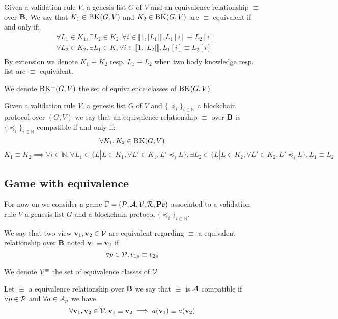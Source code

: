 \begin{mydef}
	Given a validation rule $V$, a genesis list $G$ of $V$ and an equivalence relationship $\equiv$ over $\text{\bf B}$. We say that $K_1 \in \text{\sc BK}(G,V)$ and $K_2 \in \text{\sc BK}(G,V)$ are $\equiv$ equivalent if and only if:
	\begin{eqnarray*}
		& \forall L_1 \in K_1, \exists L_2 \in K_2, \forall i \in \llbracket 1,|L_1| \rrbracket, L_1[i] \equiv L_2[i] \\
		& \forall L_2 \in K_2, \exists L_1 \in K, \forall i \in \llbracket 1,|L_2| \rrbracket, L_1[i] \equiv L_2[i] \\
	\end{eqnarray*}	
	By extension we denote $K_1 \equiv K_2$ resp. $L_1 \equiv L_2$ when two body knowledge resp. list are $\equiv$ equivalent.
\end{mydef}
We denote $\text{\sc BK}^\equiv(G,V)$ the set of equivalence classes of $\text{\sc BK}(G,V)$


\begin{mydef}
	Given a validation rule $V$, a genesis list $G$ of $V$ and $\{ \preceq_i\}_{i \in \mathbb{N}}$ a blockchain protocol over $(G,V)$ we say that an equivalence relationship $\equiv$ over $\text{\bf B}$ is $\{ \preceq_i\}_{i \in \mathbb{N}}$ compatible if and only if:
	$$\forall K_1 , K_2 \in \text{\sc BK}(G,V)$$
	$$K_1 \equiv K_2 \implies \forall i \in \mathbb{N}, \forall L_1 \in \{L | L \in K_1, \forall L' \in K_1, L' \preceq_i L \}, \exists L_2 \in \{L | L \in K_2, \forall L' \in K_2, L' \preceq_i L \}, L_1 \equiv L_2$$
\end{mydef}


\subsection{Game with equivalence}

For now on we consider a game $\Gamma = (\mathcal{P},\mathcal{A},\mathcal{V},\mathcal{R},\mathbf{Pr})$ associated to  a validation rule $V$ a genesis list $G$ and a blockchain protocol $\{ \preceq_i\}_{i \in \mathbb{N}}$. 

We say that two view $\mathbf{v}_1, \mathbf{v}_2 \in \mathcal{V}$ are equivalent regarding $\equiv$ a equivalent relationship over $\text{\bf B}$ noted $\mathbf{v}_1\equiv \mathbf{v}_2$ if $$\forall p \in \mathcal{P}, v_{1p} \equiv v_{2p}$$

We denote $\mathcal{V}^\equiv$ the set of equivalence classes of $\mathcal{V}$

\begin{mydef}
	Let $\equiv$ a equivalence relationship over $\text{\bf B}$ we say that $\equiv$ is $\mathcal{A}$ compatible if $\forall p \in \mathcal{P}$ and $\forall a \in \mathcal{A}_p$ we have $$\forall \mathbf{v}_1,\mathbf{v}_2 \in \mathcal{V}, \mathbf{v}_1 \equiv \mathbf{v}_2 \implies a(\mathbf{v}_1) \equiv a(\mathbf{v}_2 )$$
\end{mydef}

